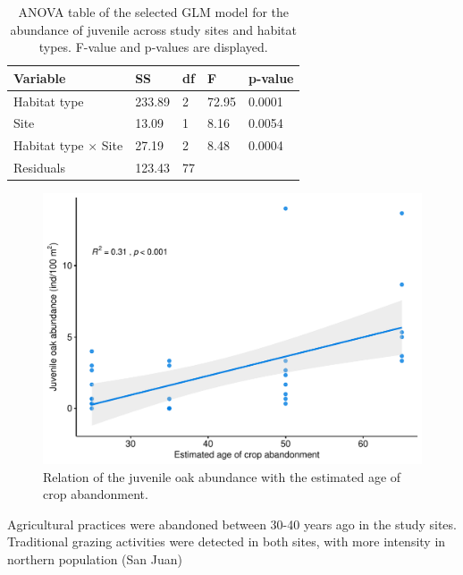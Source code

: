 \begin{table}
\caption{ANOVA table of the selected GLM model for the abundance of \Qpy juvenile across study sites and habitat types. F-value and p-values are displayed.}
\centering
\begin{tabular}{lllll} 
\toprule
\textbf{Variable}        & \textbf{SS} & \textbf{df} & \textbf{F} & \textbf{p-value}  \\ 
\midrule
Habitat type             & 233.89      & 2           & 72.95      &  0.0001           \\
Site                     & 13.09       & 1           & 8.16       & 0.0054            \\
Habitat type $\times$ Site & 27.19       & 2           & 8.48       & 0.0004            \\
Residuals                & 123.43      & 77          &            &                   \\
\bottomrule
\end{tabular}
\label{tab:coloniza:anova}
\end{table}

\begin{figure}
    \centering
    \includegraphics[width=\textwidth]{img/coloniza/coloniza-ageCrop.pdf}
    \caption{Relation of the juvenile oak abundance with the estimated age of crop abandonment.}
    \label{fig:coloniza:ageCrop}
\end{figure}



Agricultural practices were abandoned between 30-40 years ago in the study sites. Traditional grazing activities were detected in both sites, with more intensity in northern population (San Juan)


